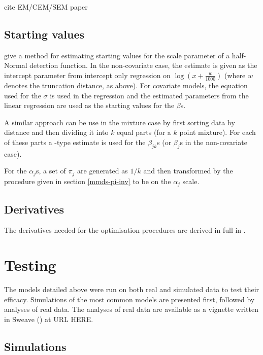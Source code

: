 cite EM/CEM/SEM paper



\subsection{Starting values}
\label{mmds-starting-vals}
\cite{beavers98} give a method for estimating starting values for the scale parameter of a half-Normal detection function. In the non-covariate case, the estimate is given as the intercept parameter from intercept only regression on $\log(x+\frac{w}{1000})$ (where $w$ denotes the truncation distance, as above). For covariate models, the equation used for the $\sigma$ is used in the regression and the estimated parameters from the linear regression are used as the starting values for the $\beta$s.

A similar approach can be use in the mixture case by first sorting data by distance and then dividing it into $k$ equal parts (for a $k$ point mixture). For each of these parts a \cite{beavers98}-type estimate is used for the $\beta_{jk}$s (or $\beta_j$s in the non-covariate case).

For the $\alpha_j$s, a set of $\pi_j$ are generated as $1/k$ and then transformed by the procedure given in section \ref{mmds-pi-inv} to be on the $\alpha_j$ scale.


\subsection{Derivatives}

The derivatives needed for the optimisation procedures are derived in full in .

\section{Testing}

The models detailed above were run on both real and simulated data to test their efficacy. Simulations of the most common models are presented first, followed by analyses of real data. The analyses of real data are available as a vignette written in Sweave (\cite{sweave}) at URL HERE.

\subsection{Simulations}

